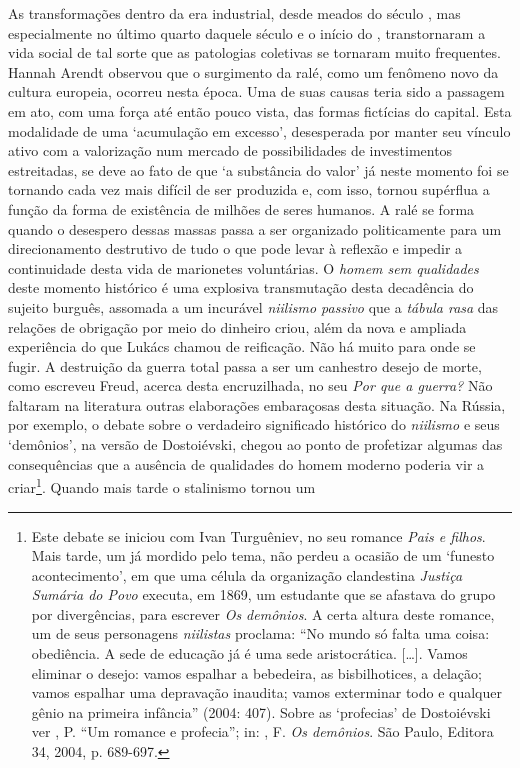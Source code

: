 As transformações dentro da era industrial, desde meados do século ,
mas especialmente no último quarto daquele século e o início do ,
transtornaram a vida social de tal sorte que as patologias coletivas se
tornaram muito frequentes. Hannah Arendt observou que o surgimento da
ralé, como um fenômeno novo da cultura europeia, ocorreu nesta época.
Uma de suas causas teria sido a passagem em ato, com uma força até então
pouco vista, das formas fictícias do capital. Esta modalidade de uma
`acumulação em excesso', desesperada por manter seu vínculo ativo com a
valorização num mercado de possibilidades de investimentos estreitadas,
se deve ao fato de que `a substância do valor' já neste momento foi se
tornando cada vez mais difícil de ser produzida e, com isso, tornou
supérflua a função da forma de existência de milhões de seres humanos. A
ralé se forma quando o desespero dessas massas passa a ser organizado
politicamente para um direcionamento destrutivo de tudo o que pode levar
à reflexão e impedir a continuidade desta vida de marionetes
voluntárias. O \emph{homem sem qualidades} deste momento histórico é uma
explosiva transmutação desta decadência do sujeito burguês, assomada a
um incurável \emph{niilismo passivo} que a \emph{tábula rasa} das
relações de obrigação por meio do dinheiro criou, além da nova e
ampliada experiência do que Lukács chamou de reificação. Não há muito
para onde se fugir. A destruição da guerra total passa a ser um
canhestro desejo de morte, como escreveu Freud, acerca desta
encruzilhada, no seu \emph{Por que a guerra?} Não faltaram na
literatura outras elaborações embaraçosas desta situação. Na Rússia, por
exemplo, o debate sobre o verdadeiro significado histórico do
\emph{niilismo} e seus `demônios', na versão de Dostoiévski, chegou ao
ponto de profetizar algumas das consequências que a ausência de
qualidades do homem moderno poderia vir a criar\footnote{Este debate se
  iniciou com Ivan Turguêniev, no seu romance \emph{Pais e filhos}. Mais
  tarde, um  já mordido pelo tema, não perdeu a ocasião de um
  `funesto acontecimento', em que uma célula da organização clandestina
  \emph{Justiça Sumária do Povo} executa, em 1869, um estudante que se
  afastava do grupo por divergências, para escrever \emph{Os demônios}.
  A certa altura deste romance, um de seus personagens \emph{niilistas}
  proclama: ``No mundo só falta uma coisa: obediência. A sede de
  educação já é uma sede aristocrática. [\ldots{}]. Vamos eliminar o
  desejo: vamos espalhar a bebedeira, as bisbilhotices, a delação; vamos
  espalhar uma depravação inaudita; vamos exterminar todo e qualquer
  gênio na primeira infância'' (2004: 407). Sobre as `profecias' de
  Dostoiévski ver , P. ``Um romance e profecia''; in:
  , F. \emph{Os demônios}. São Paulo, Editora 34,
  2004, p. 689-697.}. Quando mais tarde o stalinismo tornou um
